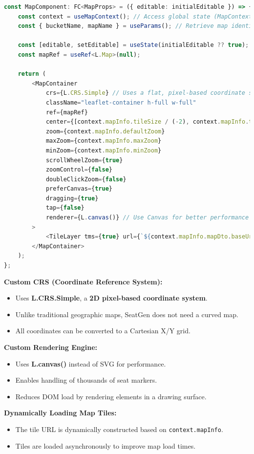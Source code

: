 \begin{lstlisting}[language=TypeScript, caption=Initializing Leaflet Map in React, label=lst:react-leaflet]
const MapComponent: FC<MapProps> = ({ editable: initialEditable }) => {
    const context = useMapContext(); // Access global state (MapContext.tsx)
    const { bucketName, mapName } = useParams(); // Retrieve map identifiers from URL params

    const [editable, setEditable] = useState(initialEditable ?? true);
    const mapRef = useRef<L.Map>(null);

    return (
        <MapContainer
            crs={L.CRS.Simple} // Uses a flat, pixel-based coordinate system
            className="leaflet-container h-full w-full"
            ref={mapRef}
            center={[context.mapInfo.tileSize / (-2), context.mapInfo.tileSize / (2)]}
            zoom={context.mapInfo.defaultZoom}
            maxZoom={context.mapInfo.maxZoom}
            minZoom={context.mapInfo.minZoom}
            scrollWheelZoom={true}
            zoomControl={false}
            doubleClickZoom={false}
            preferCanvas={true}
            dragging={true}
            tap={false}
            renderer={L.canvas()} // Use Canvas for better performance
        >
            <TileLayer tms={true} url={`${context.mapInfo.mapDto.baseUrl}/{z}/{x}/{y}.png`} />
        </MapContainer>
    );
};
\end{lstlisting}

\textbf{Custom CRS (Coordinate Reference System):}
\begin{itemize}
    \item Uses \textbf{L.CRS.Simple}, a \textbf{2D pixel-based coordinate system}.
    \item Unlike traditional geographic maps, SeatGen does not need a curved map.
    \item All coordinates can be converted to a Cartesian X/Y grid.
\end{itemize}

\textbf{Custom Rendering Engine:}
\begin{itemize}
    \item Uses \textbf{L.canvas()} instead of SVG for performance.
    \item Enables handling of thousands of seat markers.
    \item Reduces DOM load by rendering elements in a drawing surface.
\end{itemize}

\textbf{Dynamically Loading Map Tiles:}
\begin{itemize}
    \item The tile URL is dynamically constructed based on \texttt{context.mapInfo}.
    \item Tiles are loaded asynchronously to improve map load times.
\end{itemize}


